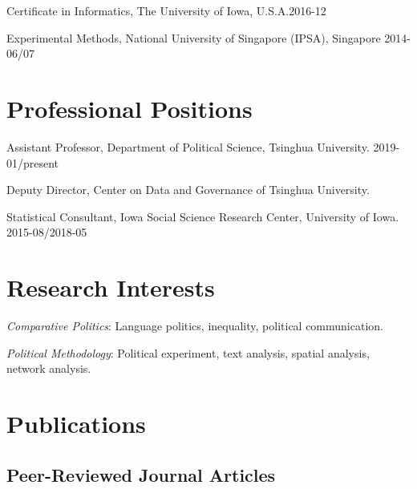 \documentclass[10.5pt,]{article}
\providecommand{\tightlist}{%
	\setlength{\itemsep}{0pt}\setlength{\parskip}{0pt}}
\renewenvironment{itemize}{
	\begin{list}{}{
			\setlength{\leftmargin}{1.5em}
		}
	}{
	\end{list}
}
\begin{document}
\begin{itemize}
\tightlist
\item
  Certificate in Informatics, The University of Iowa,
  U.S.A.\hfill 2016-12
\item
  Experimental Methods, National University of Singapore (IPSA),
  Singapore \hfill 2014-06/07
\end{itemize}

\hypertarget{professional-positions}{%
\section{Professional Positions}\label{professional-positions}}

\begin{itemize}
\tightlist
\item
  Assistant Professor, Department of Political Science, Tsinghua
  University. \hfill 2019-01/present

  \begin{itemize}
  \tightlist
  \item
    Deputy Director, Center on Data and Governance of Tsinghua
    University.
  \end{itemize}
\item
  Statistical Consultant, Iowa Social Science Research Center,
  University of Iowa. \hfill 2015-08/2018-05
\end{itemize}

\hypertarget{research-interests}{%
\section{Research Interests}\label{research-interests}}

\begin{itemize}
\tightlist
\item
  \emph{Comparative Politics}: Language politics, inequality, political
  communication.
\item
  \emph{Political Methodology}: Political experiment, text analysis,
  spatial analysis, network analysis.
\end{itemize}

\hypertarget{publications}{%
\section{Publications}\label{publications}}

\hypertarget{peer-reviewed-journal-articles}{%
\subsection{Peer-Reviewed Journal
Articles}\label{peer-reviewed-journal-articles}}
\end{document}
